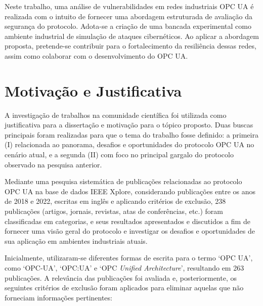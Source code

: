     Neste trabalho, uma análise de vulnerabilidades em redes industriais OPC UA é realizada com o intuito de fornecer uma abordagem estruturada de avaliação da segurança do protocolo. Adota-se a criação de uma bancada experimental como ambiente industrial de simulação de ataques cibernéticos. Ao aplicar a abordagem proposta, pretende-se contribuir para o fortalecimento da resiliência dessas redes, assim como colaborar com o desenvolvimento do OPC UA.

    
    \section{Motivação e Justificativa} \label{sec:motivacao}

    A investigação de trabalhos na comunidade científica foi utilizada como justificativa para a dissertação e motivação para o tópico proposto. Duas buscas principais foram realizadas para que o tema do trabalho fosse definido: a primeira (I) relacionada ao panorama, desafios e oportunidades do protocolo OPC UA no cenário atual, e a segunda (II) com foco no principal gargalo do protocolo observado na pesquisa anterior.
    
    Mediante uma pesquisa sistemática de publicações relacionadas ao protocolo OPC UA na base de dados IEEE Xplore, considerando publicações entre os anos de 2018 e 2022, escritas em inglês e aplicando critérios de exclusão, 238 publicações (artigos, jornais, revistas, atas de conferências, etc.) foram classificadas em categorias, e seus resultados apresentados e discutidos a fim de fornecer uma visão geral do protocolo e investigar os desafios e oportunidades de sua aplicação em ambientes industriais atuais.

    Inicialmente, utilizaram-se diferentes formas de escrita para o termo `OPC UA', como `OPC-UA', `OPC:UA' e `OPC \textit{Unified Architecture}', resultando em 263 publicações. A relevância das publicações foi avaliada e, posteriormente, os seguintes critérios de exclusão foram aplicados para eliminar aquelas que não forneciam informações pertinentes:

